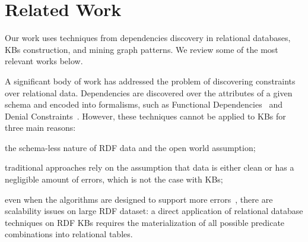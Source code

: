 \section{Related Work} \label{sec:krd_related}

Our work %
uses techniques from dependencies discovery in relational databases, KBs construction, and mining graph patterns. 
We review some of the most relevant works below.

A significant body of work has addressed the problem of discovering constraints over relational data. 
Dependencies are discovered over the attributes of a given schema and encoded into formalisms, such as 
Functional Dependencies~\cite{abiteboul1995foundations,huhtala1999tane} 
and Denial Constraints~\cite{chu2013discovering}. 
%
%
However, these techniques cannot be applied to KBs for three main reasons:
\begin{inparaenum}[\itshape(i)]
	\item the schema-less nature of RDF data and the open world assumption; %
	\item traditional approaches rely on the assumption that data is either clean or has a negligible amount of errors, which is not the case with KBs;
	\item even when the algorithms are designed to support more errors~\cite{abedjan2015temporal,kivinen1995approximate}, there are scalability issues on large RDF dataset: a direct application of relational database techniques on RDF KBs requires the materialization of all possible predicate combinations into relational tables.
\end{inparaenum}
